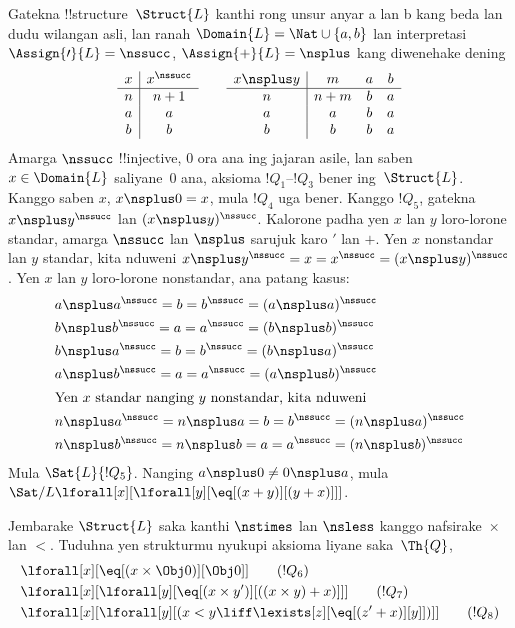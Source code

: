 \documentclass[../../../include/open-logic-section]{subfiles}
\begin{document}
\begin{ex}
Gatekna !!{structure}~$\Struct{L}$
kanthi rong unsur anyar a lan b kang beda lan dudu wilangan asli, lan ranah
$\Domain{L} = \Nat \cup \{a, b\}$
lan interpretasi
$\Assign{\prime}{L} = \nssucc$,
$\Assign{+}{L} = \nsplus$
kang diwenehake dening
\[
\begin{array}{c|c}
  x & x^\nssucc \\
  \hline
  n & n+1 \\
  a & a\\
  b & b
\end{array}
\qquad
\begin{array}{c|ccc}
  x \nsplus y & m & a & b\\
  \hline
  n & n+m & b & a\\
  a & a & b & a\\
  b & b & b & a
\end{array}
\]
Amarga $\nssucc$
!!{injective},
$0$ ora ana ing
jajaran asile,
lan saben
$x \in \Domain{L}$
saliyane~$0$ ana,
aksioma $!Q_1$--$!Q_3$
bener ing~$\Struct{L}$.
Kanggo saben $x$,
$x \nsplus 0 = x$,
mula $!Q_4$ uga bener.
Kanggo $!Q_5$,
gatekna
$x \nsplus y^\nssucc$
lan $(x \nsplus
y)^\nssucc$.
Kalorone padha yen
$x$ lan $y$
loro-lorone standar,
amarga $\nssucc$
lan $\nsplus$
sarujuk karo $\prime$
lan $+$.
Yen $x$ nonstandar
lan $y$ standar,
kita nduweni
$x \nsplus y^\nssucc = x =
x^\nssucc = (x \nsplus y)^\nssucc$.
Yen $x$ lan $y$
loro-lorone nonstandar,
ana patang kasus:
\begin{align*}
&  a \nsplus a^\nssucc  = b = b^\nssucc = (a \nsplus a)^\nssucc\\
&  b \nsplus b^\nssucc  = a = a^\nssucc = (b \nsplus b)^\nssucc\\
&  b \nsplus a^\nssucc  = b = b^\nssucc = (b \nsplus a)^\nssucc\\
&  a \nsplus b^\nssucc  = a = a^\nssucc = (a \nsplus b)^\nssucc\\
\intertext{Yen $x$ standar nanging $y$ nonstandar, kita nduweni}
&  n \nsplus a^\nssucc  = n \nsplus a = b = b^\nssucc = (n \nsplus a)^\nssucc\\
&  n \nsplus b^\nssucc  = n \nsplus b = a = a^\nssucc = (n \nsplus b)^\nssucc
\end{align*}
Mula
$\Sat{L}{!Q_5}$.
Nanging
$a \nsplus 0 \neq 0 \nsplus a$,
mula
$\Sat/{L}{\lforall[x][\lforall[y][\eq[(x+y)][(y+x)]]]}$.
\end{ex}

\begin{prob}
Jembarake $\Struct{L}$
saka
kanthi $\nstimes$
lan $\nsless$
kanggo nafsirake~$\times$
lan $<$.
Tuduhna yen strukturmu
nyukupi aksioma liyane
saka~$\Th{Q}$,
\begin{align*}
& \lforall[x][\eq[(x \times \Obj 0)][\Obj 0]] \tag{$!Q_6$}\\ &
  \lforall[x][\lforall[y][\eq[(x \times y')][((x \times y) + x)]]]
  \tag{$!Q_7$}\\ & \lforall[x][\lforall[y][(x < y \liff \lexists[z][\eq[(z'+x)][y]])]] \tag{$!Q_8$}
\end{align*}
\end{prob}
\end{document}
